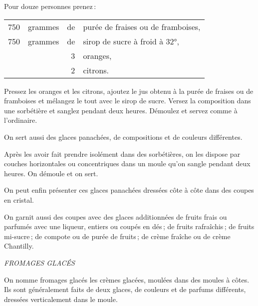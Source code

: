 \medskip

Pour douze personnes prenez :

\footnotesize
\begin{longtable}{rrrp{16em}}
    750 & grammes & de & purée de fraises ou de framboises,                                               \\
    750 & grammes & de & sirop de sucre à froid à 32°,                                                    \\
        &         &  3 & oranges,                                                                         \\
        &         &  2 & citrons.                                                                         \\
\end{longtable}
\normalsize

Pressez les oranges et les citrons, ajoutez le jus obtenu à la purée de fraises
ou de framboises et mélangez le tout avec le sirop de sucre. Versez la
composition dans une sorbétière et sanglez pendant deux heures. Démoulez et
servez comme à l'ordinaire.

\sk

On sert aussi des glaces panachées, de compositions et de couleurs différentes.

Après les avoir fait prendre isolément dans des sorbétières, on les dispose par
couches horizontales ou concentriques dans un moule qu'on sangle pendant deux
heures. On démoule et on sert.

\sk

On peut enfin présenter ces glaces panachées dressées côte à côte dans des
coupes en cristal.

\sk

On garnit aussi des coupes avec des glaces additionnées de fruits frais ou
parfumés avec une liqueur, entiers ou coupés en dés ; de fruits rafraîchis ; de
fruits mi-sucre ; de compote ou de purée de fruits ; de crème fraîche ou de
crème Chantilly.

\bigskip

\begin{center}
\textit{FROMAGES GLACÉS}
\end{center}

\bigskip

On nomme fromages glacés les crèmes glacées, moulées dans des moules à côtes.
Ils sont généralement faits de deux glaces, de couleurs et de parfums
différents, dressées verticalement dans le moule.

